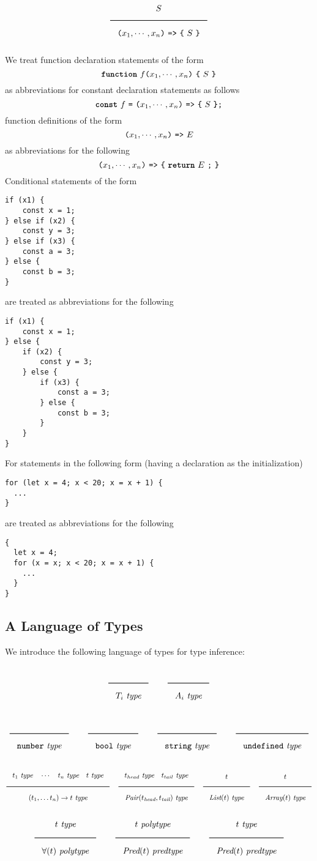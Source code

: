 \[ \Rule{S}{\Lp x_1,\cdots, x_n\Rp\ \texttt{=>}\ \Lc\ S\ \Rc} \]

\noindent
We treat function declaration statements of the form
%
\[ \Fun\ f \Lp x_1,\cdots, x_n\Rp\ \Lc\ S\ \Rc \]
%
\noindent
as abbreviations for constant declaration statements as follows
%
\[ \textbf{\texttt{const}}\ f\ \texttt{=}\ \texttt{(} x_1,\cdots, x_n\texttt{)}\ \texttt{=>}\ \texttt{\{}\ S\ \texttt{\}} \texttt{;} \]
%
function definitions of the form 
%
\[ \texttt{(} x_1,\cdots, x_n\texttt{)}\ \texttt{=>}\ E \]
%
\noindent
as abbreviations for the following
%
\[ \Lp x_1,\cdots, x_n\Rp\ \texttt{=>}\ \Lc\ \Return\ E\ \texttt{;}\ \Rc \]
%
Conditional statements of the form 
\begin{lstlisting}
if (x1) {
    const x = 1;    
} else if (x2) {
    const y = 3;
} else if (x3) {
    const a = 3;
} else {
    const b = 3;
}
\end{lstlisting}
\noindent
are treated as abbreviations for the following
\begin{lstlisting}
if (x1) {
    const x = 1;    
} else {
    if (x2) {
        const y = 3;
    } else {
        if (x3) {
            const a = 3;
        } else {
            const b = 3;
        }
    }
}
\end{lstlisting}

For statements in the following form (having a declaration as the initialization)
\begin{lstlisting}
for (let x = 4; x < 20; x = x + 1) {
  ...
}
\end{lstlisting}
\noindent
are treated as abbreviations for the following
\begin{lstlisting}
{
  let x = 4;
  for (x = x; x < 20; x = x + 1) {
    ...
  }
}
\end{lstlisting}
  
\subsection{A Language of Types}
\label{simpltyped}

We introduce the following language of types for type inference:

\[
\Rule{}{T_i\ \type}
\qquad
\Rule{}{A_i\ \type}
\]

\[
\Rule{}{\Number\ \type}
\qquad
\Rule{}{\Bool\ \type}
\qquad
\Rule{}{\String\ \type}
\qquad
\Rule{}{\Undefined\ \type}
\]

\[ \Rule{t_1\ \type \quad \cdots\quad t_n\ \type \quad t\ \type}{(t_1, \ldots t_n) \rightarrow t\ \type}
\quad
\Rule{t_{head}\ \type \quad t_{tail}\ \type}{\Pair(t_\head,t_\tail)\ \type}
\quad
\Rule{t}{\List(t)\ \type}
\quad
\Rule{t}{\Array(t)\ \type}
\]
\[
\Rule{t\ \type}{\forall ( t )\ \polytype}
\qquad
\Rule{t\ \polytype}{\Pred(t)\ \predtype}
\qquad
\Rule{t\ \type}{\Pred(t)\ \predtype}
\]


